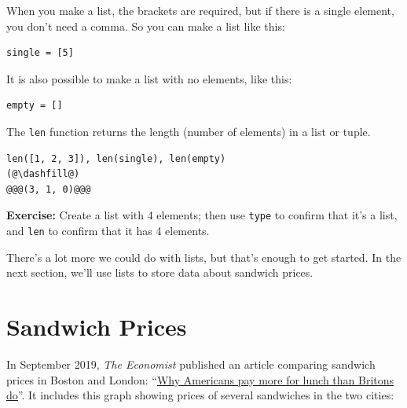 When you make a list, the brackets are required, but if there is a
single element, you don't need a comma. So you can make a list like
this:

\begin{lstlisting}[]
single = [5]
\end{lstlisting}

It is also possible to make a list with no elements, like this:

\begin{lstlisting}[]
empty = []
\end{lstlisting}

The \passthrough{\lstinline!len!} function returns the length (number of
elements) in a list or tuple.

\begin{lstlisting}[]
len([1, 2, 3]), len(single), len(empty)
(@\dashfill@)
@@@(3, 1, 0)@@@
\end{lstlisting}

\textbf{Exercise:} Create a list with 4 elements; then use
\passthrough{\lstinline!type!} to confirm that it's a list, and
\passthrough{\lstinline!len!} to confirm that it has 4 elements.

There's a lot more we could do with lists, but that's enough to get
started. In the next section, we'll use lists to store data about
sandwich prices.

\hypertarget{sandwich-prices}{%
\section{Sandwich Prices}\label{sandwich-prices}}

In September 2019, \emph{The Economist} published an article comparing
sandwich prices in Boston and London:
``\href{https://www.economist.com/finance-and-economics/2019/09/07/why-americans-pay-more-for-lunch-than-britons-do}{Why
Americans pay more for lunch than Britons do}''. It includes this graph
showing prices of several sandwiches in the two cities:

